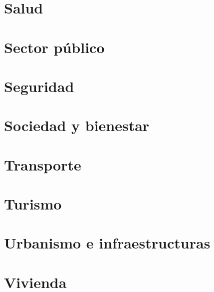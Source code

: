 \documentclass[
  10pt,
  a4paper,
  DIV=11,
  numbers=noendperiod]{scrreprt}
\begin{document}

\hypertarget{salud}{%
\chapter{Salud}\label{salud}}


\hypertarget{sector-puxfablico}{%
\chapter{Sector público}\label{sector-puxfablico}}


\hypertarget{seguridad}{%
\chapter{Seguridad}\label{seguridad}}


\hypertarget{sociedad-y-bienestar}{%
\chapter{Sociedad y bienestar}\label{sociedad-y-bienestar}}


\hypertarget{transporte}{%
\chapter{Transporte}\label{transporte}}


\hypertarget{turismo}{%
\chapter{Turismo}\label{turismo}}


\hypertarget{urbanismo-e-infraestructuras}{%
\chapter{Urbanismo e
infraestructuras}\label{urbanismo-e-infraestructuras}}


\hypertarget{vivienda}{%
\chapter{Vivienda}\label{vivienda}}
\end{document}

